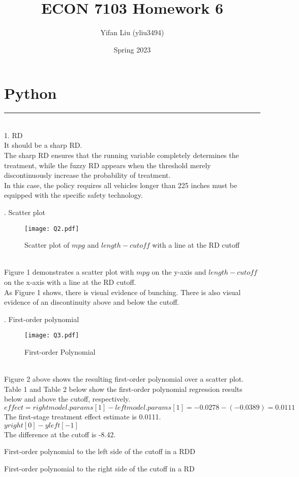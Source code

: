 \documentclass{article}
\title{ECON 7103 Homework 6}
\author{Yifan Liu (yliu3494)}
\date{Spring 2023}
\begin{document}
  
\maketitle


\noindent
\section{Python}
\noindent\rule{17cm}{0.4pt}
\smallskip
\\
1. RD
\smallskip
\\ It should be a sharp RD.
\\ The sharp RD ensures that the running variable completely determines the treatment, while the fuzzy RD appears when the threshold merely discontinuously increase the probability of treatment.
\\ In this case, the policy requires all vehicles longer than 225 inches must be equipped with the specific safety technology.
\bigskip

. Scatter plot
\smallskip
\begin{figure}[H]
    \centering
    \texttt{[image: Q2.pdf]}
    \caption{Scatter plot of $mpg$ and $length - cutoff$ with a line at the RD cutoff}
    \label{fig:Q2}
\end{figure}
\noindent
\\ Figure 1 demonstrates a scatter plot with $mpg$ on the y-axis and $length-cutoff$ on the x-axis with a line at the RD cutoff.
\\ As Figure 1 shows, there is visual evidence of bunching. There is also visual evidence of an discontinuity above and below the cutoff.
\bigskip

. First-order polynomial
\smallskip
\begin{figure}[H]
    \centering
    \texttt{[image: Q3.pdf]}
    \caption{First-order Polynomial}
    \label{fig:Q3}
\end{figure}
\noindent
\\ Figure 2 above shows the resulting first-order polynomial over a scatter plot. 
\\ Table 1 and Table 2 below show the first-order polynomial regression results below and above the cutoff, respectively.
\\ $effect = rightmodel.params[1] - leftmodel.params[1] = -0.0278 - (-0.0389) = 0.0111$
\\ The first-stage treatment effect estimate is 0.0111. 
\\ $yright[0] - yleft[-1]$
\\ The difference at the cutoff is -8.42.
\begin{table}[H]
    \centering
    
    \caption{First-order polynomial to the left side of the cutoff in a RDD}
    \label{tab:Q3L}
\end{table}
\begin{table}[H]
    \centering
    
    \caption{First-order polynomial to the right side of the cutoff in a RD}
    \label{tab:Q3R}
\end{table}
\bigskip
\end{document}

